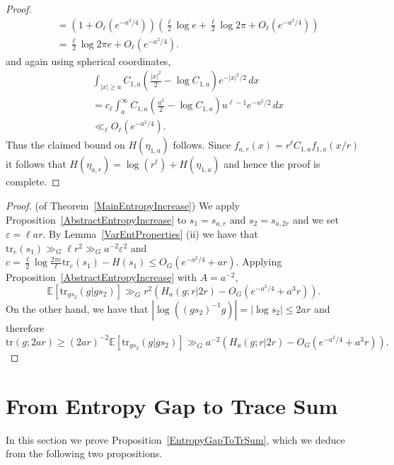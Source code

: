 \documentclass[10pt, english,oneside,reqno]{amsart}
\theoremstyle{plain}
\theoremstyle{remark}
\numberwithin{equation}{section}
\numberwithin{figure}{section}
\newcommand{\eps}{\varepsilon}
\newcommand{\tr}{\mathrm{tr}}
\newcommand{\E}{\mathbb{E}}
\begin{document}
\begin{proof}
\begin{align*}
    &= \left( 1 + O_{\ell}(e^{-a^2/4}) \right)\left(  \frac{\ell}{2}\log e + \frac{\ell}{2} \log 2\pi + O_{\ell}(e^{-a^2/4}) \right) \\
    &= \frac{\ell}{2} \log 2\pi e + O_{\ell}(e^{-a^2/4}).
    \end{align*} and again using spherical coordinates, 
    \begin{align*}
    &\int_{|x| \geq a} C_{1,a}\left(  \frac{|x|^2}{2} - \log C_{1,a} \right) e^{-|x|^2/2}  \, dx \\ &= c_{\ell}\int_{a}^{\infty} C_{1,a}\left(  \frac{u^2}{2} - \log C_{1,a} \right) u^{\ell - 1} e^{-u^2/2}  \, dx \\
    &\ll_{\ell} O_{\ell}(e^{-a^2/4}).
    \end{align*} Thus the claimed bound on $H(\eta_{1,a})$ follows. Since $f_{a,r}(x) = r^{\ell}C_{1,a}f_{1,a}(x/r)$ it follows that $H(\eta_{a,r}) = \log(r^{\ell}) + H(\eta_{1,a})$ and hence the proof is complete. 
\end{proof}



\begin{proof}(of Theorem~\ref{MainEntropyIncrease})
    We apply Proposition~\ref{AbstractEntropyIncrease} to $s_1 = s_{a,r}$ and $s_2 = s_{a, 2r}$ and we set $\eps = \ell ar$. By Lemma~\ref{VarEntProperties} (ii) we have that $\mathrm{tr}_e(s_{1}) \gg_{G} \ell r^2 \gg_{G} a^{-2}\eps^2$ and  $c = \frac{\ell}{2} \log \frac{2\pi e}{\ell} \mathrm{tr}_e(s_1) - H(s_1) \leq O_{G}(e^{-a^2/4} + ar).$ Applying Proposition~\ref{AbstractEntropyIncrease} with $A = a^{-2}$, $$\E[\mathrm{tr}_{gs_2}(g|gs_2)]  \gg_G  r^2(H_a(g; r|2r) - O_{G}(e^{-a^2/4} + a^3 r)).$$ On the other hand, we have that $|\log((gs_2)^{-1}g)| = |\log s_2| \leq 2ar$ and therefore $$\tr(g;2ar) \geq (2ar)^{-2}\E[\mathrm{tr}_{gs_2}(g|gs_2)]\gg_G a^{-2}(H_a(g; r|2r) - O_{G}(e^{-a^2/4} + a^3r)).$$
\end{proof}







    \section{From Entropy Gap to Trace Sum} \label{EntGapTrSumSection}




In this section we prove Proposition~\ref{EntropyGapToTrSum}, which we deduce from the following two propositions.  
\end{document}
